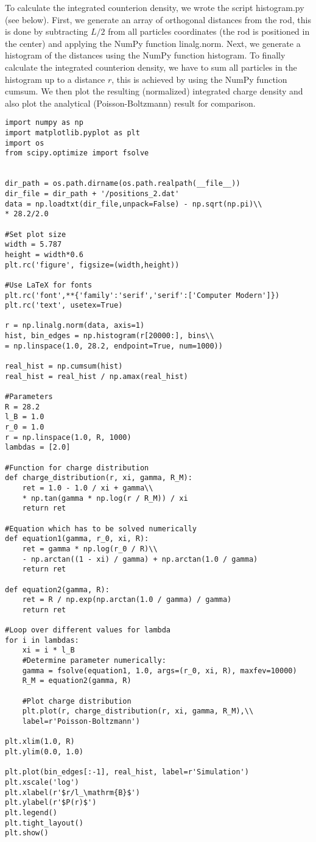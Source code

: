 \documentclass[a4paper,10pt,bibtotoc]{scrartcl}
\begin{document}
To calculate the integrated counterion density, we wrote the script histogram.py (see below). 
First, we generate an array of orthogonal distances from the rod, this is done by subtracting $L/2$ from all particles coordinates (the rod is positioned in the center) and applying the NumPy function linalg.norm.
Next, we generate a histogram of the distances using the NumPy function histogram. 
To finally calculate the integrated counterion density, we have to sum all particles in the histogram up to a distance $r$, this is achieved by using the NumPy function cumsum.
We then plot the resulting (normalized) integrated charge density and also plot the analytical (Poisson-Boltzmann) result for comparison.
\begin{lstlisting}
import numpy as np
import matplotlib.pyplot as plt
import os
from scipy.optimize import fsolve


dir_path = os.path.dirname(os.path.realpath(__file__))
dir_file = dir_path + '/positions_2.dat'
data = np.loadtxt(dir_file,unpack=False) - np.sqrt(np.pi)\\
* 28.2/2.0

#Set plot size
width = 5.787
height = width*0.6
plt.rc('figure', figsize=(width,height))

#Use LaTeX for fonts
plt.rc('font',**{'family':'serif','serif':['Computer Modern']})
plt.rc('text', usetex=True)

r = np.linalg.norm(data, axis=1)
hist, bin_edges = np.histogram(r[20000:], bins\\
= np.linspace(1.0, 28.2, endpoint=True, num=1000))

real_hist = np.cumsum(hist)
real_hist = real_hist / np.amax(real_hist)

#Parameters
R = 28.2
l_B = 1.0
r_0 = 1.0
r = np.linspace(1.0, R, 1000)
lambdas = [2.0]

#Function for charge distribution
def charge_distribution(r, xi, gamma, R_M):
    ret = 1.0 - 1.0 / xi + gamma\\
    * np.tan(gamma * np.log(r / R_M)) / xi
    return ret

#Equation which has to be solved numerically
def equation1(gamma, r_0, xi, R):
    ret = gamma * np.log(r_0 / R)\\
    - np.arctan((1 - xi) / gamma) + np.arctan(1.0 / gamma)
    return ret

def equation2(gamma, R):
    ret = R / np.exp(np.arctan(1.0 / gamma) / gamma)
    return ret

#Loop over different values for lambda
for i in lambdas:
    xi = i * l_B
    #Determine parameter numerically:
    gamma = fsolve(equation1, 1.0, args=(r_0, xi, R), maxfev=10000)
    R_M = equation2(gamma, R)
    
    #Plot charge distribution
    plt.plot(r, charge_distribution(r, xi, gamma, R_M),\\
    label=r'Poisson-Boltzmann')

plt.xlim(1.0, R)
plt.ylim(0.0, 1.0)

plt.plot(bin_edges[:-1], real_hist, label=r'Simulation')
plt.xscale('log')
plt.xlabel(r'$r/l_\mathrm{B}$')
plt.ylabel(r'$P(r)$')
plt.legend()
plt.tight_layout()
plt.show()
\end{lstlisting}
\end{document}

